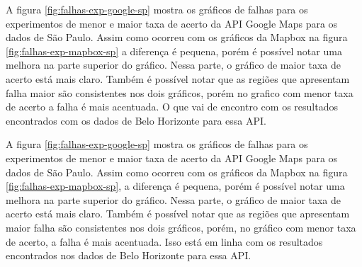 A figura \ref{fig:falhas-exp-google-sp} mostra os gráficos de falhas para os experimentos de menor e maior taxa de acerto da API Google Maps para os dados de São Paulo. Assim como ocorreu com os gráficos da Mapbox na figura \ref{fig:falhas-exp-mapbox-sp} a diferença é pequena, porém é possível notar uma melhora na parte superior do gráfico. Nessa parte, o gráfico de maior taxa de acerto está mais claro. Também é possível notar que as regiões que apresentam falha maior são consistentes nos dois gráficos, porém no grafico com menor taxa de acerto a falha é mais acentuada. O que vai de encontro com os resultados encontrados com os dados de Belo Horizonte para essa API.

A figura \ref{fig:falhas-exp-google-sp} mostra os gráficos de falhas para os experimentos de menor e maior taxa de acerto da API Google Maps para os dados de São Paulo. Assim como ocorreu com os gráficos da Mapbox na figura \ref{fig:falhas-exp-mapbox-sp}, a diferença é pequena, porém é possível notar uma melhora na parte superior do gráfico. Nessa parte, o gráfico de maior taxa de acerto está mais claro. Também é possível notar que as regiões que apresentam maior falha são consistentes nos dois gráficos, porém, no gráfico com menor taxa de acerto, a falha é mais acentuada. Isso está em linha com os resultados encontrados nos dados de Belo Horizonte para essa API.

